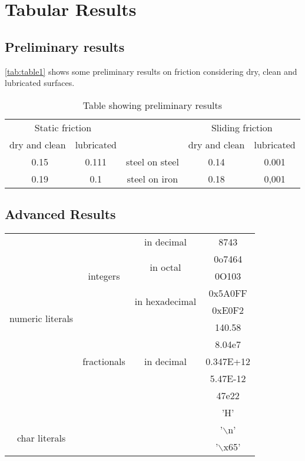 \documentclass{article}
\begin{document}
\section{Tabular Results}

\subsection{Preliminary results}
\autoref{tab:table1} shows some preliminary results on friction considering dry, clean and lubricated surfaces.

\begin{table}[h]
    \centering
    \begin{tabular}{|c|c|c|c|c|}
    \hline
    \multicolumn{2}{|c|}{Static friction}
         &  \multirow{2}{*}{    } & \multicolumn{2}{|c|}{Sliding friction}\\
    \cline{1-2}
    \cline{4-5}
    dry and clean & lubricated &    & dry and clean & lubricated\\
    \hline
    \ 0.15 & 0.111 & steel on steel & 0.14 & 0.001 \\
    \ 0.19 & 0.1 & steel on iron & 0.18 & 0,001 \\
    \hline
    \end{tabular}
    \caption{Table showing preliminary results}
    \label{tab:table1}
\end{table}

\subsection{Advanced Results}
\begin{table}[h]
    \centering
    \begin{tabular}{|c|c|c|c|}
    \hline
    \multirow{10}{*}{numeric literals} & \multirow{5}{*}{integers} & in decimal & 8743\\
    \cline{3-4}
    & & \multirow{2}{*}{in octal} & 0o7464\\
    \cline{4-4}
    & & & 0O103\\
    \cline{3-4}
    & & \multirow{2}{*}{in hexadecimal} & 0x5A0FF\\
    \cline{4-4}
    & & & 0xE0F2\\
    \cline{2-4}
    & \multirow{5}{*}{fractionals} & \multirow{5}{*}{in decimal} & 140.58\\
    \cline{4-4}
    & & & 8.04e7 \\
    \cline{4-4}
    & & & 0.347E+12 \\
    \cline{4-4}
    & & & 5.47E-12\\
    \cline{4-4}
    & & & 47e22\\
    \hline
    \multicolumn{3}{|c|}{   } & 'H'\\
    \cline{4-4}
    \multirow{2}{*}{char literals} & \multirow{2}{*}{   } & \multirow{2}{*}{   } & '$\backslash$n'\\
    \cline{4-4}
    & & & '$\backslash$x65'\\
    \hline
    \end{tabular}
    \label{tab:table2}
\end{table}
\end{document}
